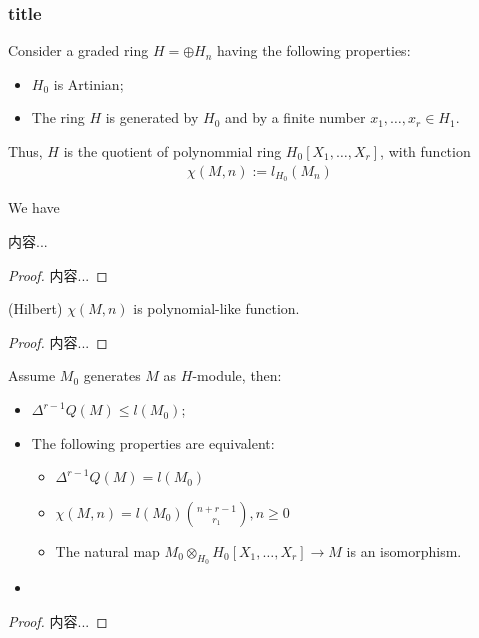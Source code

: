 \documentclass[Total.tex]{subfiles}
\begin{document}
				\subsubsection{title}
				\begin{Def}
					Consider a graded ring $H=\oplus H_n$ having the following properties:
					\begin{itemize}
						\item $H_0$ is Artinian;
						\item The ring $H$ is generated by $H_0$ and by a finite number $x_1,\dots,x_r\in H_1$.
					\end{itemize}
					Thus, $H$ is the quotient of polynommial ring $H_0[X_1,\dots,X_r]$, with function
					\begin{gather*}
						\chi(M,n):=l_{H_0}(M_n)
					\end{gather*}
				\end{Def}
				We have
				\begin{proposition}
					内容...
				\end{proposition}
				\begin{proof}
					内容...
				\end{proof}
				
				\begin{theorem}
					(Hilbert) $\chi(M,n)$ is polynomial-like function.
				\end{theorem}
				\begin{proof}
					内容...
				\end{proof}
				
				\begin{theorem}
					Assume $M_0$ generates $M$ as $H$-module, then:
					\begin{itemize}
						\item $\Delta^{r-1} Q(M)\leq l(M_0)$; 
						\item The following properties are equivalent:
						\begin{itemize}
							\item $\Delta^{r-1} Q(M)=l(M_0)$
							\item $\chi(M,n)=l(M_0)\binom{n+r-1}{r_1},n\geq 0$
							\item The natural map $M_0\otimes_{H_0} H_0[X_1,\dots,X_r]\rightarrow M$ is an isomorphism.
						\end{itemize}
						\item 
					\end{itemize}
				\end{theorem}
				\begin{proof}
					内容...
				\end{proof}
				
\end{document}
